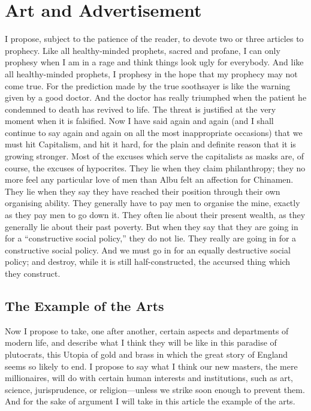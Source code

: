 \documentclass{book}
\begin{document}
\chapter{Art and Advertisement}
\label{chapter-0}
I propose, subject to the patience of the reader, to devote two or three articles to prophecy. Like all healthy-minded prophets, sacred and profane, I can only prophesy when I am in a rage and think things look ugly for everybody. And like all healthy-minded prophets, I prophesy in the hope that my prophecy may not come true. For the prediction made by the true soothsayer is like the warning given by a good doctor. And the doctor has really triumphed when the patient he condemned to death has revived to life. The threat is justified at the very moment when it is falsified. Now I have said again and again (and I shall continue to say again and again on all the most inappropriate occasions) that we must hit Capitalism, and hit it hard, for the plain and definite reason that it is growing stronger. Most of the excuses which serve the capitalists as masks are, of course, the excuses of hypocrites. They lie when they claim philanthropy; they no more feel any particular love of men than Albu felt an affection for Chinamen. They lie when they say they have reached their position through their own organising ability. They generally have to pay men to organise the mine, exactly as they pay men to go down it. They often lie about their present wealth, as they generally lie about their past poverty. But when they say that they are going in for a “constructive social policy,” they do not lie. They really are going in for a constructive social policy. And we must go in for an equally destructive social policy; and destroy, while it is still half-constructed, the accursed thing which they construct.

\section{The Example of the Arts}
Now I propose to take, one after another, certain aspects and departments of modern life, and describe what I think they will be like in this paradise of plutocrats, this Utopia of gold and brass in which the great story of England seems so likely to end. I propose to say what I think our new masters, the mere millionaires, will do with certain human interests and institutions, such as art, science, jurisprudence, or religion—unless we strike soon enough to prevent them. And for the sake of argument I will take in this article the example of the arts.
\end{document}
